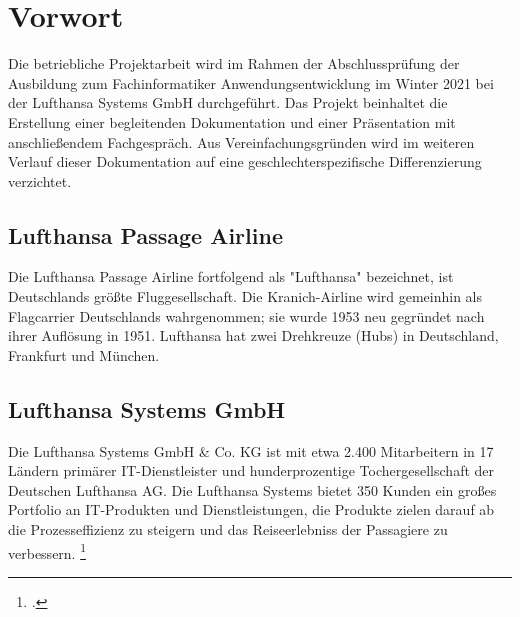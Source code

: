 \section{Vorwort}

	Die betriebliche Projektarbeit wird im Rahmen der Abschlussprüfung der Ausbildung zum
	Fachinformatiker Anwendungsentwicklung im Winter 2021 bei der Lufthansa Systems GmbH durchgeführt.
	Das Projekt beinhaltet die Erstellung einer begleitenden
	Dokumentation und einer Präsentation mit anschließendem Fachgespräch. Aus Vereinfachungsgründen wird im weiteren Verlauf dieser Dokumentation auf eine geschlechterspezifische
	Differenzierung verzichtet.


	\subsection{Lufthansa Passage Airline}
	Die Lufthansa Passage Airline fortfolgend als "Lufthansa" bezeichnet, ist Deutschlands größte Fluggesellschaft. Die Kranich-Airline wird gemeinhin als Flagcarrier Deutschlands wahrgenommen; sie wurde 1953 neu gegründet nach ihrer Auflösung in 1951. Lufthansa hat zwei Drehkreuze (Hubs) in Deutschland, Frankfurt und München.

	\subsection{Lufthansa Systems GmbH}
	Die Lufthansa Systems GmbH \& Co. KG ist mit etwa 2.400 Mitarbeitern in 17 Ländern primärer IT-Dienstleister und hunderprozentige Tochergesellschaft der Deutschen Lufthansa AG.
	Die Lufthansa Systems bietet 350 Kunden ein großes Portfolio an IT-Produkten und Dienstleistungen, die Produkte zielen darauf ab die Prozesseffizienz zu steigern und das Reiseerlebniss der Passagiere zu verbessern.
	\footcite{1}

